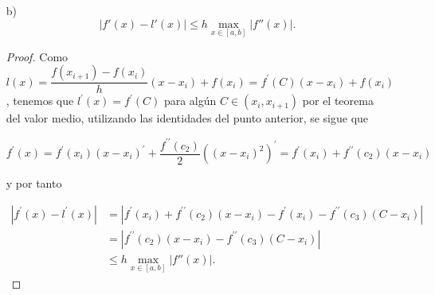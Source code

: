 \begin{itemize}
\begin{proof}
        $$|f(x)-l(x)|\leq=\frac{h^2}{2}\max_{x\in [a,b]}|f^{\prime\prime}(x)|$$
    \end{proof}

    \item[b)] $$|f'(x) - l'(x)| \leq h \max_{x \in [a,b]} |f''(x)|.$$

    \begin{proof}
        Como $l(x)=\dfrac{f(x_{i+1})-f(x_i)}{h}(x-x_i)+f(x_i)=f^{\prime}(C)(x-x_i)+f(x_i)$, tenemos que $l^{\prime}(x)=f^{\prime}(C)$ para algún $C\in (x_i,x_{i+1})$ por el teorema del valor medio, utilizando las identidades del punto anterior, se sigue que

        $$f^{\prime}(x)=f^{\prime}(x_i)(x-x_i)^{\prime}+\frac{f^{\prime\prime}(c_2)}{2}((x-x_i)^2)^{\prime}=f^{\prime}(x_i)+f^{\prime\prime}(c_2)(x-x_i)$$

        y por tanto

        \begin{align*}
            |f^{\prime}(x)-l^{\prime}(x)|&=|f^{\prime}(x_i)+f^{\prime\prime}(c_2)(x-x_i)-f^{\prime}(x_i)-f^{\prime\prime}(c_3)(C-x_i)|\\
            &=|f^{\prime\prime}(c_2)(x-x_i)-f^{\prime\prime}(c_3)(C-x_i)|\\
            &\leq h \max_{x \in [a,b]} |f''(x)|
        .\end{align*}
    \end{proof}
\end{itemize}